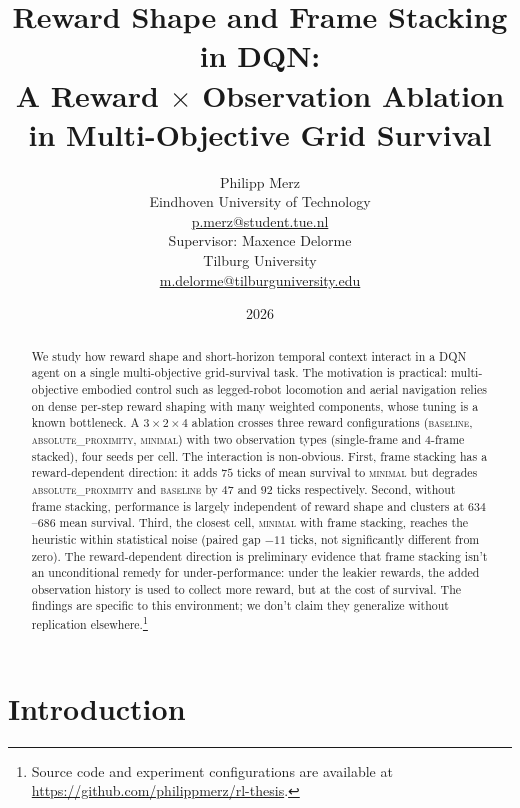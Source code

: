 \documentclass[12pt,a4paper,titlepage]{article}
\title{Reward Shape and Frame Stacking in DQN:\\A Reward $\times$ Observation Ablation in Multi-Objective Grid Survival}
\author{Philipp Merz\\
        \normalsize Eindhoven University of Technology\\
        \normalsize \href{mailto:p.merz@student.tue.nl}{p.merz@student.tue.nl}\\[0.6em]
        \normalsize Supervisor: Maxence Delorme\\
        \normalsize Tilburg University\\
        \normalsize \href{mailto:m.delorme@tilburguniversity.edu}{m.delorme@tilburguniversity.edu}}
\date{2026}
\begin{document}
\maketitle
\begin{abstract}
We study how reward shape and short-horizon temporal context interact in a DQN agent on a single multi-objective grid-survival task. The motivation is practical: multi-objective embodied control such as legged-robot locomotion and aerial navigation relies on dense per-step reward shaping with many weighted components, whose tuning is a known bottleneck. A $3 \times 2 \times 4$ ablation crosses three reward configurations (\textsc{baseline}, \textsc{absolute\_proximity}, \textsc{minimal}) with two observation types (single-frame and 4-frame stacked), four seeds per cell. The interaction is non-obvious. First, frame stacking has a reward-dependent direction: it adds $75$ ticks of mean survival to \textsc{minimal} but degrades \textsc{absolute\_proximity} and \textsc{baseline} by $47$ and $92$ ticks respectively. Second, without frame stacking, performance is largely independent of reward shape and clusters at $634$--$686$ mean survival. Third, the closest cell, \textsc{minimal} with frame stacking, reaches the heuristic within statistical noise (paired gap $-11$ ticks, not significantly different from zero). The reward-dependent direction is preliminary evidence that frame stacking isn't an unconditional remedy for under-performance: under the leakier rewards, the added observation history is used to collect more reward, but at the cost of survival. The findings are specific to this environment; we don't claim they generalize without replication elsewhere.\footnote{Source code and experiment configurations are available at \url{https://github.com/philippmerz/rl-thesis}.}
\end{abstract}

\tableofcontents
\newpage

\section{Introduction}
\label{sec:introduction}
\end{document}
